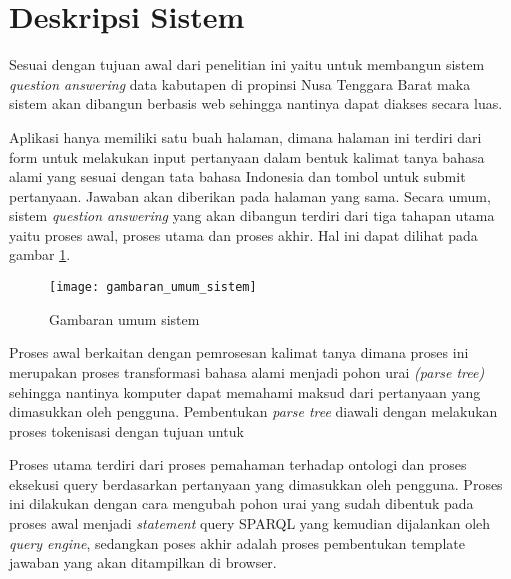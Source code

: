 \section{Deskripsi Sistem}
Sesuai dengan tujuan awal dari penelitian ini yaitu untuk membangun sistem \emph{question answering} data kabutapen di propinsi Nusa Tenggara Barat maka sistem akan dibangun berbasis web sehingga nantinya dapat diakses secara luas.

Aplikasi hanya memiliki satu buah halaman, dimana halaman ini terdiri dari form untuk melakukan input pertanyaan dalam bentuk kalimat tanya bahasa alami yang sesuai dengan tata bahasa Indonesia dan tombol untuk submit pertanyaan. Jawaban akan diberikan pada halaman yang sama. Secara umum, sistem \emph{question answering} yang akan dibangun terdiri dari tiga tahapan utama yaitu proses awal, proses utama dan proses akhir. Hal ini dapat dilihat pada gambar \ref{fig:gambaran_umum_sistem}.

\begin{figure}[th]
	\centering
	\texttt{[image: gambaran\_umum\_sistem]}
	\caption{Gambaran umum sistem}
	\label{fig:gambaran_umum_sistem}
\end{figure}

Proses awal berkaitan dengan pemrosesan kalimat tanya dimana proses ini merupakan proses transformasi bahasa alami menjadi pohon urai \emph{(parse tree)} sehingga nantinya komputer dapat memahami maksud dari pertanyaan yang dimasukkan oleh pengguna. Pembentukan \emph{parse tree} diawali dengan melakukan proses tokenisasi dengan tujuan untuk 

Proses utama terdiri dari proses pemahaman terhadap ontologi dan proses eksekusi query berdasarkan pertanyaan yang dimasukkan oleh pengguna. Proses ini dilakukan dengan cara mengubah pohon urai yang sudah dibentuk pada proses awal menjadi \emph{statement} query SPARQL yang kemudian dijalankan oleh \emph{query engine}, sedangkan poses akhir adalah proses pembentukan template jawaban yang akan ditampilkan di browser.
